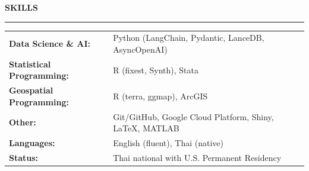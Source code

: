 \documentclass[11pt,letterpaper]{article}
\renewcommand{\section}[1]{%
  \par\vspace{10pt}%
  {\large\bfseries\color{accent}#1}\par\vspace{-3pt}%
  {\color{accent}\rule{\linewidth}{0.6pt}}\par\vspace{4pt}}
\begin{document}
\section{SKILLS}
\begin{tabular}{@{}l p{4.6in}@{}}
  \textbf{Data Science \& AI:} & Python (LangChain, Pydantic, LanceDB, AsyncOpenAI) \\
  \textbf{Statistical Programming:} & R (fixest, Synth), Stata \\
  \textbf{Geospatial Programming:} & R (terra, ggmap), ArcGIS \\
  \textbf{Other:} & Git/GitHub, Google Cloud Platform, Shiny, \LaTeX, MATLAB \\
  \textbf{Languages:} & English (fluent), Thai (native) \\
  \textbf{Status:} & Thai national with U.S. Permanent Residency \\
\end{tabular}
\end{document}
